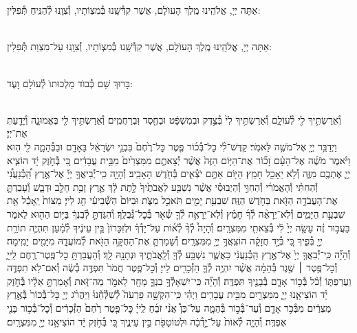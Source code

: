 \documentclass[twoside, openany, parskip=half, 11pt]{book}
\begin{document}
\\
\\
אַתָּה יְיָ, אֱלֹהֵֽינוּ מֶֽלֶךְ הָעוֺלָם, אֲשֶׁר קִדְּ֯שָֽׁנוּ בְּ֯מִצְוֹתָיו, וְ֯צִוָֽנוּ לְ֯הַנִּֽיחַ תְּ֯פִלִּין:

\\
אַתָּה יְיָ, אֱלֹהֵֽינוּ מֶֽלֶךְ הָעוֺלָם, אֲשֶׁר קִדְּ֯שָֽׁנוּ בְּ֯מִצְוֹתָיו, וְ֯צִוָֽנוּ עַל־מִצְוַת תְּ֯פִלִּין:

\\
בָּרוּךְ שֵׁם כְּ֯בוֺד מַלְכוּתוֺ לְ֯עוֺלָם וָעֶד:


\\
וְ֯אֵרַשְׂתִּ֥יךְ לִ֖י לְ֯עוֹלָ֑ם וְ֯אֵרַשְׂתִּ֥יךְ לִי֙ בְּ֯צֶ֣דֶק וּבְמִשְׁפָּ֔ט וּבְחֶ֖סֶד וּֽבְרַחֲמִֽים׃ וְ֯אֵרַשְׂתִּ֥יךְ לִ֖י בֶּאֱמוּנָ֑ה וְ֯יָדַ֖עַתְּ אֶת־יְיָ׃\\
וַיְדַבֵּ֥ר יְיָ֖ אֶל־מֹשֶׁ֥ה לֵּאמֹֽר׃ קַדֶּשׁ־לִ֨י כׇל־בְּ֯כ֜וֹר פֶּ֤טֶר כׇּל־רֶ֙חֶם֙ בִּבְנֵ֣י יִשְׂרָאֵ֔ל בָּאָדָ֖ם וּבַבְּ֯הֵמָ֑ה לִ֖י הֽוּא׃ וַיֹּ֨אמֶר מֹשֶׁ֜ה אֶל־הָעָ֗ם זָכ֞וֹר אֶת־הַיּ֤וֹם הַזֶּה֙ אֲשֶׁ֨ר יְ֯צָאתֶ֤ם מִמִּצְרַ֙יִם֙ מִבֵּ֣ית עֲבָדִ֔ים כִּ֚י בְּ֯חֹ֣זֶק יָ֔ד הוֹצִ֧יא יְיָ֛ אֶתְכֶ֖ם מִזֶּ֑ה וְ֯לֹ֥א יֵאָכֵ֖ל חָמֵֽץ׃ הַיּ֖וֹם אַתֶּ֣ם יֹצְ֯אִ֑ים בְּ֯חֹ֖דֶשׁ הָאָבִֽיב׃ וְ֯הָיָ֣ה כִֽי־יְ֯בִיאֲךָ֣ יְיָ֡ אֶל־אֶ֣רֶץ הַֽ֠כְּ֯נַעֲנִ֠י וְ֯הַחִתִּ֨י וְ֯הָאֱמֹרִ֜י וְ֯הַחִוִּ֣י וְ֯הַיְבוּסִ֗י אֲשֶׁ֨ר נִשְׁבַּ֤ע לַאֲבֹתֶ֙יךָ֙ לָ֣תֶת לָ֔ךְ אֶ֛רֶץ זָבַ֥ת חָלָ֖ב וּדְבָ֑שׁ וְ֯עָבַדְתָּ֛ אֶת־הָעֲבֹדָ֥ה הַזֹּ֖את בַּחֹ֥דֶשׁ הַזֶּֽה׃ שִׁבְעַ֥ת יָמִ֖ים תֹּאכַ֣ל מַצֹּ֑ת וּבַיּוֹם֙ הַשְּׁ֯בִיעִ֔י חַ֖ג לַייָ׃ מַצּוֹת֙ יֵֽאָכֵ֔ל אֵ֖ת שִׁבְעַ֣ת הַיָּמִ֑ים וְ֯לֹֽא־יֵרָאֶ֨ה לְ֯ךָ֜ חָמֵ֗ץ וְ֯לֹֽא־יֵרָאֶ֥ה לְ֯ךָ֛ שְׂ֯אֹ֖ר בְּ֯כׇל־גְּ֯בֻלֶֽךָ׃ וְ֯הִגַּדְתָּ֣ לְ֯בִנְךָ֔ בַּיּ֥וֹם הַה֖וּא לֵאמֹ֑ר בַּעֲב֣וּר זֶ֗ה עָשָׂ֤ה יְיָ֙ לִ֔י בְּ֯צֵאתִ֖י מִמִּצְרָֽיִם׃ וְ֯הָיָה֩ לְ֯ךָ֨ לְ֯א֜וֹת עַל־יָדְ֯ךָ֗ וּלְזִכָּרוֹן֙ בֵּ֣ין עֵינֶ֔יךָ לְ֯מַ֗עַן תִּהְיֶ֛ה תּוֹרַ֥ת יְיָ֖ בְּ֯פִ֑יךָ כִּ֚י בְּ֯יָ֣ד חֲזָקָ֔ה הוֹצִֽאֲךָ֥ יְיָ֖ מִמִּצְרָֽיִם׃ וְ֯שָׁמַרְתָּ֛ אֶת־הַחֻקָּ֥ה הַזֹּ֖את לְ֯מוֹעֲדָ֑הּ מִיָּמִ֖ים יָמִֽימָה׃\\

וְ֯הָיָ֞ה כִּֽי־יְ֯בִאֲךָ֤ יְיָ֙ אֶל־אֶ֣רֶץ הַֽכְּ֯נַעֲנִ֔י כַּאֲשֶׁ֛ר נִשְׁבַּ֥ע לְ֯ךָ֖ וְ֯לַֽאֲבֹתֶ֑יךָ וּנְתָנָ֖הּ לָֽךְ׃ וְ֯הַעֲבַרְתָּ֥ כׇל־פֶּֽטֶר־רֶ֖חֶם לַֽייָ֑ וְ֯כׇל־פֶּ֣טֶר ׀ שֶׁ֣גֶר בְּ֯הֵמָ֗ה אֲשֶׁ֨ר יִהְיֶ֥ה לְ֯ךָ֛ הַזְּ֯כָרִ֖ים לַייָ׃ וְ֯כׇל־פֶּ֤טֶר חֲמֹר֙ תִּפְדֶּ֣ה בְ֯שֶׂ֔ה וְ֯אִם־לֹ֥א תִפְדֶּ֖ה וַעֲרַפְתּ֑וֹ וְ֯כֹ֨ל בְּ֯כ֥וֹר אָדָ֛ם בְּ֯בָנֶ֖יךָ תִּפְדֶּֽה׃ וְ֯הָיָ֞ה כִּֽי־יִשְׁאָלְ֯ךָ֥ בִנְךָ֛ מָחָ֖ר לֵאמֹ֣ר מַה־זֹּ֑את וְ֯אָמַרְתָּ֣ אֵלָ֔יו בְּ֯חֹ֣זֶק יָ֗ד הוֹצִיאָ֧נוּ יְיָ֛ מִמִּצְרַ֖יִם מִבֵּ֥ית עֲבָדִֽים׃ וַיְהִ֗י כִּֽי־הִקְשָׁ֣ה פַרְעֹה֮ לְ֯שַׁלְּ֯חֵ֒נוּ֒ וַיַּהֲרֹ֨ג יְיָ֤ כׇּל־בְּ֯כוֹר֙ בְּ֯אֶ֣רֶץ מִצְרַ֔יִם מִבְּ֯כֹ֥ר אָדָ֖ם וְ֯עַד־בְּ֯כ֣וֹר בְּ֯הֵמָ֑ה עַל־כֵּן֩ אֲנִ֨י זֹבֵ֜חַ לַֽייָ֗ כׇּל־פֶּ֤טֶר רֶ֙חֶם֙ הַזְּ֯כָרִ֔ים וְ֯כׇל־בְּ֯כ֥וֹר בָּנַ֖י אֶפְדֶּֽה׃ וְ֯הָיָ֤ה לְ֯אוֹת֙ עַל־יָ֣דְ֯כָ֔ה וּלְטוֹטָפֹ֖ת בֵּ֣ין עֵינֶ֑יךָ כִּ֚י בְּ֯חֹ֣זֶק יָ֔ד הוֹצִיאָ֥נוּ יְיָ֖ מִמִּצְרָֽיִם׃
\end{document}
